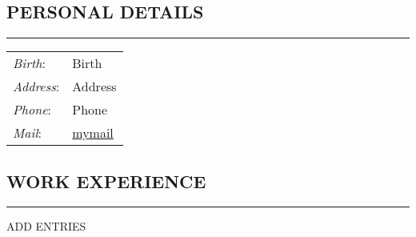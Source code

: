 \documentclass[12pt, a4paper, titlepage]{article}
\begin{document}
\hfill
\begin{minipage}[t]{.62 \textwidth}
	\vspace{0pt}
	\begin{flushleft}
		
		\subsection*{PERSONAL DETAILS}
		\hrule
		\vskip2mm
		\begin{tabular}{l l}
		\textit{Birth}: & Birth \\
		\textit{Address}: & Address \\
		\textit{Phone}: & Phone \\
		\textit{Mail}: & \href{mailto:your@mail.here}{mymail}	
		\end{tabular}
		
		\vskip3mm
		
		\subsection*{WORK EXPERIENCE}
		\hrule
		\vskip2mm
		ADD ENTRIES
	\end{flushleft}
\end{minipage}
\end{document}
